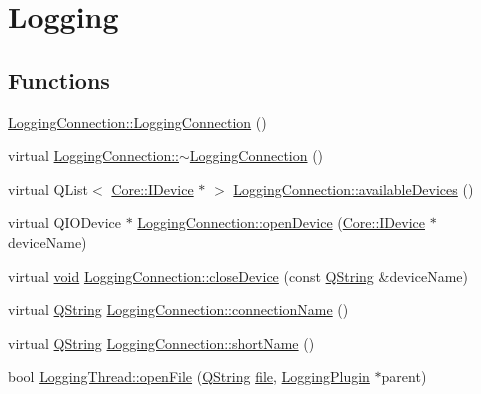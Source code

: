 \hypertarget{group___logging}{\section{\-Logging}
\label{group___logging}
}
\subsection*{\-Functions}
\begin{DoxyCompactItemize}
\item 
\hyperlink{group___logging_ga4e4cd5c90f83710ae2807a8257db1c70}{\-Logging\-Connection\-::\-Logging\-Connection} ()
\item 
virtual \hyperlink{group___logging_ga0d9d6cd072a5b35292b5e4ffeda50fcd}{\-Logging\-Connection\-::$\sim$\-Logging\-Connection} ()
\item 
virtual \-Q\-List$<$ \hyperlink{class_core_1_1_i_device}{\-Core\-::\-I\-Device} $\ast$ $>$ \hyperlink{group___logging_ga0ed63dc5111dcd536bacc7655b878e8f}{\-Logging\-Connection\-::available\-Devices} ()
\item 
virtual \-Q\-I\-O\-Device $\ast$ \hyperlink{group___logging_ga592075585208489ed59844d9d7175015}{\-Logging\-Connection\-::open\-Device} (\hyperlink{class_core_1_1_i_device}{\-Core\-::\-I\-Device} $\ast$device\-Name)
\item 
virtual \hyperlink{group___u_a_v_objects_plugin_ga444cf2ff3f0ecbe028adce838d373f5c}{void} \hyperlink{group___logging_gaeb291639744d4248ab7422d57444ea0a}{\-Logging\-Connection\-::close\-Device} (const \hyperlink{group___u_a_v_objects_plugin_gab9d252f49c333c94a72f97ce3105a32d}{\-Q\-String} \&device\-Name)
\item 
virtual \hyperlink{group___u_a_v_objects_plugin_gab9d252f49c333c94a72f97ce3105a32d}{\-Q\-String} \hyperlink{group___logging_gaca41f5a7a58289c24cdf4975b9718091}{\-Logging\-Connection\-::connection\-Name} ()
\item 
virtual \hyperlink{group___u_a_v_objects_plugin_gab9d252f49c333c94a72f97ce3105a32d}{\-Q\-String} \hyperlink{group___logging_gaf569eb0407d501102e1257c067a05295}{\-Logging\-Connection\-::short\-Name} ()
\item 
bool \hyperlink{group___logging_gabd55e7242d33b800b73a8ff3fc56deb5}{\-Logging\-Thread\-::open\-File} (\hyperlink{group___u_a_v_objects_plugin_gab9d252f49c333c94a72f97ce3105a32d}{\-Q\-String} \hyperlink{uavobjecttemplate_8m_a97c04efa65bcf0928abf9260bc5cbf46}{file}, \hyperlink{class_logging_plugin}{\-Logging\-Plugin} $\ast$parent)
\item 

\end{DoxyCompactItemize}
